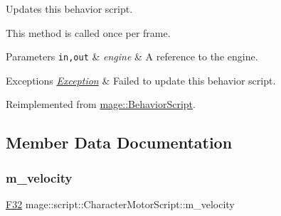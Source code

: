Updates this behavior script.

This method is called once per frame.


\begin{DoxyParams}[1]{Parameters}
\mbox{\tt in,out}  & {\em engine} & A reference to the engine. \\
\hline
\end{DoxyParams}

\begin{DoxyExceptions}{Exceptions}
{\em \mbox{\hyperlink{classmage_1_1_exception}{Exception}}} & Failed to update this behavior script. \\
\hline
\end{DoxyExceptions}


Reimplemented from \mbox{\hyperlink{classmage_1_1_behavior_script_a085634661326b59850c1111e537baa4e}{mage\+::\+Behavior\+Script}}.



\subsection{Member Data Documentation}
\mbox{\label{classmage_1_1script_1_1_character_motor_script_a30db45f04bc56380729af037e71ff237}} 
\subsubsection{\texorpdfstring{m\+\_\+velocity}{m\_velocity}}
{\footnotesize\ttfamily \mbox{\hyperlink{namespacemage_aa97e833b45f06d60a0a9c4fc22ae02c0}{F32}} mage\+::script\+::\+Character\+Motor\+Script\+::m\+\_\+velocity\hspace{0.3cm}{\ttfamily [private]}}

